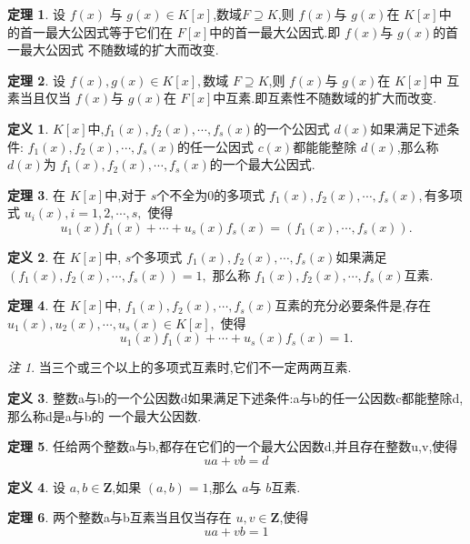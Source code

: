 \documentclass[a4paper,11pt]{article}%
\theoremstyle{remark}
\newtheorem*{remark}{注}
\theoremstyle{definition}
\newtheorem{theorem}{定理}[section]
\theoremstyle{definition}
\newtheorem*{definition}{定义}
\theoremstyle{plain}
\begin{document}
\begin{theorem}
    设 $f(x)$ 与 $g(x)\in K[x]$,数域$F\supseteq K$,则 $f(x)$与 $g(x)$在 $K[x]$中
    的首一最大公因式等于它们在 $F[x]$中的首一最大公因式.即 $f(x)$与 $g(x)$的首一最大公因式
    不随数域的扩大而改变.
\end{theorem}
\begin{theorem}
    设 $f(x),g(x)\in K[x],$数域 $F\supseteq K$,则 $f(x)$与 $g(x)$在 $K[x]$中
    互素当且仅当 $f(x)$与 $g(x)$在 $F[x]$中互素.即互素性不随数域的扩大而改变.
\end{theorem}
\begin{definition}
    $K[x]$中,$f_1(x),f_2(x),\cdots,f_s(x)$的一个公因式 $d(x)$如果满足下述条件:
    $f_1(x),f_2(x),\cdots,f_s(x)$的任一公因式 $c(x)$都能能整除 $d(x)$,那么称 $d(x)$为 
    $f_1(x),f_2(x),\cdots,f_s(x)$的一个最大公因式.
\end{definition}
\begin{theorem}
    在 $K[x]$中,对于 $s$个不全为0的多项式 $f_1(x),f_2(x),\cdots,f_s(x),$有多项式 $u_i(x),i=1,2,\cdots,s,$
    使得
    \[u_1(x)f_1(x)+\cdots + u_s(x)f_s(x)=(f_1(x),\cdots,f_s(x)).\]
\end{theorem}
\begin{definition}
    在 $K[x]$中, $s$个多项式 $f_1(x),f_2(x),\cdots,f_s(x)$如果满足 $(f_1(x),f_2(x),\cdots,f_s(x))=1,$
    那么称 $f_1(x),f_2(x),\cdots,f_s(x)$互素.
\end{definition}
\begin{theorem}
    在 $K[x]$中, $f_1(x),f_2(x),\cdots,f_s(x)$互素的充分必要条件是,存在 $u_1(x),u_2(x),\cdots,u_s(x)\in K[x],$
    使得 
    \[u_1(x)f_1(x)+\cdots+u_s(x)f_s(x)=1.\]
\end{theorem}
\begin{remark}
    当三个或三个以上的多项式互素时,它们不一定两两互素.
\end{remark}
\begin{definition}
    整数a与b的一个公因数d如果满足下述条件:a与b的任一公因数c都能整除d,那么称d是a与b的
    一个最大公因数.
\end{definition}
\begin{theorem}
    任给两个整数a与b,都存在它们的一个最大公因数d,并且存在整数u,v,使得
    \[ua+vb=d\]
\end{theorem}
\begin{definition}
    设 $a,b\in \mathbf{Z}$,如果 $(a,b)=1$,那么 $a$与 $b$互素.
\end{definition}
\begin{theorem}
    两个整数a与b互素当且仅当存在 $u,v\in \mathbf{Z}$,使得
    \[ua+vb=1\]
\end{theorem}
\end{document}
